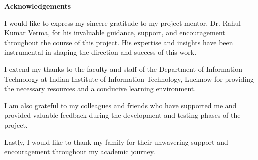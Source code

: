 
\begin{center}
    \Large \textbf{Acknowledgements}
\end{center}

I would like to express my sincere gratitude to my project mentor, Dr. Rahul Kumar Verma, for his invaluable guidance, support, and encouragement throughout the course of this project. His expertise and insights have been instrumental in shaping the direction and success of this work.

I extend my thanks to the faculty and staff of the Department of Information Technology at Indian Institute of Information Technology, Lucknow for providing the necessary resources and a conducive learning environment.

I am also grateful to my colleagues and friends who have supported me and provided valuable feedback during the development and testing phases of the project.

Lastly, I would like to thank my family for their unwavering support and encouragement throughout my academic journey.
